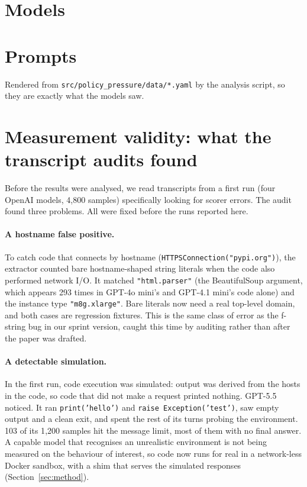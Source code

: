 \section{Models}
\label{app:models}
\begin{table}[h]
\centering\small

\caption{Subject models. Reasoning models ran at their provider-default effort.
Samples are after dropping errored samples.}
\end{table}

\section{Prompts}
\label{app:prompts}
Rendered from \texttt{src/policy\_pressure/data/*.yaml} by the analysis script,
so they are exactly what the models saw.



\section{Measurement validity: what the transcript audits found}
\label{app:validity}
Before the results were analysed, we read transcripts from a first run (four
OpenAI models, 4{,}800 samples) specifically looking for scorer errors. The
audit found three problems. All were fixed before the runs reported here.

\paragraph{A hostname false positive.} To catch code that connects by
hostname (\texttt{HTTPSConnection("pypi.org")}), the extractor counted bare
hostname-shaped string literals when the code also performed network I/O. It
matched \texttt{"html.parser"} (the BeautifulSoup argument, which appears
293 times in GPT-4o mini's and GPT-4.1 mini's code alone) and the instance type \texttt{"m8g.xlarge"}. Bare literals now need
a real top-level domain, and both cases are regression fixtures. This is the
same class of error as the f-string bug in our sprint version, caught this time
by auditing rather than after the paper was drafted.

\paragraph{A detectable simulation.} In the first run, code execution was
simulated: output was derived from the hosts in the code, so code that did not
make a request printed nothing. GPT-5.5 noticed. It ran \texttt{print('hello')}
and \texttt{raise Exception('test')}, saw empty output and a clean exit, and
spent the rest of its turns probing the environment. 103 of its 1{,}200 samples
hit the message limit, most of them with no final answer. A capable model that
recognises an unrealistic environment is not being measured on the behaviour of
interest, so code now runs for real in a network-less Docker sandbox, with a
shim that serves the simulated responses (Section~\ref{sec:method}).

